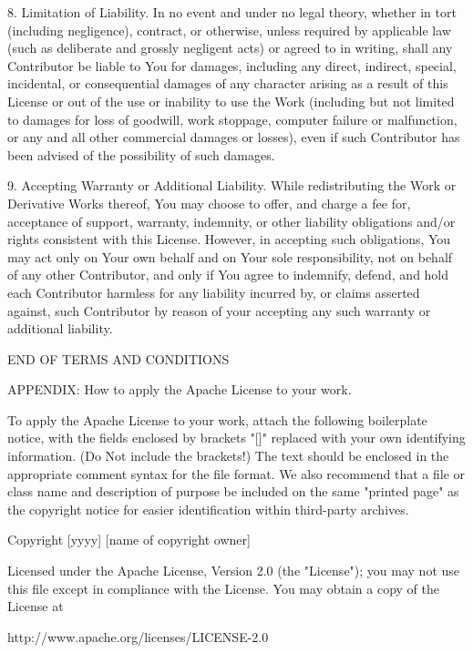 \documentclass[twoside]{tceusermanual}
\begin{document}
   8. Limitation of Liability. In no event and under no legal theory,
      whether in tort (including negligence), contract, or otherwise,
      unless required by applicable law (such as deliberate and grossly
      negligent acts) or agreed to in writing, shall any Contributor be
      liable to You for damages, including any direct, indirect, special,
      incidental, or consequential damages of any character arising as a
      result of this License or out of the use or inability to use the
      Work (including but not limited to damages for loss of goodwill,
      work stoppage, computer failure or malfunction, or any and all
      other commercial damages or losses), even if such Contributor
      has been advised of the possibility of such damages.

   9. Accepting Warranty or Additional Liability. While redistributing
      the Work or Derivative Works thereof, You may choose to offer,
      and charge a fee for, acceptance of support, warranty, indemnity,
      or other liability obligations and/or rights consistent with this
      License. However, in accepting such obligations, You may act only
      on Your own behalf and on Your sole responsibility, not on behalf
      of any other Contributor, and only if You agree to indemnify,
      defend, and hold each Contributor harmless for any liability
      incurred by, or claims asserted against, such Contributor by reason
      of your accepting any such warranty or additional liability.

   END OF TERMS AND CONDITIONS

   APPENDIX: How to apply the Apache License to your work.

      To apply the Apache License to your work, attach the following
      boilerplate notice, with the fields enclosed by brackets "[]"
      replaced with your own identifying information. (Do Not include
      the brackets!)  The text should be enclosed in the appropriate
      comment syntax for the file format. We also recommend that a
      file or class name and description of purpose be included on the
      same "printed page" as the copyright notice for easier
      identification within third-party archives.

   Copyright [yyyy] [name of copyright owner]

   Licensed under the Apache License, Version 2.0 (the "License");
   you may not use this file except in compliance with the License.
   You may obtain a copy of the License at

       http://www.apache.org/licenses/LICENSE-2.0
\end{document}
